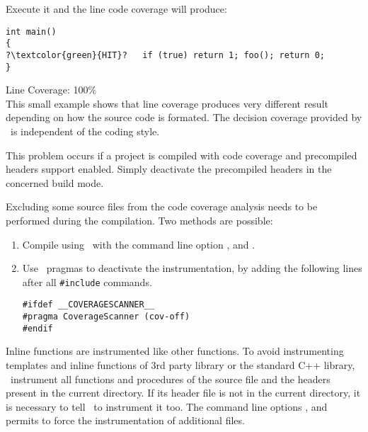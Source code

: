 Execute it and the line code coverage will produce:
\begin{lstlisting}[escapechar=?]
int main()
{
?\textcolor{green}{HIT}?   if (true) return 1; foo(); return 0;
}
\end{lstlisting}
Line Coverage: 100\%\\

This small example shows that line coverage produces very different result
depending on how the source code is formated.
The decision coverage provided by \TestCocoon\ is independent of the coding style.



This problem occurs if a project is compiled with code coverage and precompiled headers support enabled.
Simply deactivate the precompiled headers in the concerned build mode.



Excluding some source files from the code coverage analysis needs to be performed during the compilation. Two methods are possible:
\begin{enumerate}
\item Compile using \CoverageScanner\ with the command line option ,  and .
\item Use \CoverageScanner\ pragmas to deactivate the instrumentation, by adding the following lines after all \lstinline$#include$ commands.
\begin{lstlisting}
#ifdef __COVERAGESCANNER__
#pragma CoverageScanner (cov-off)
#endif
\end{lstlisting}
\end{enumerate}

Inline functions are instrumented like other functions.
To avoid instrumenting templates and inline functions of 3rd party library or
the standard C++ library, \CoverageScanner\ instrument all functions and procedures of the source
file and the headers present in the current directory. 
If its header file is not in the current directory, it is necessary to tell \CoverageScanner\ to instrument it too.
The command line options ,  and  permits to force the instrumentation of additional files.

